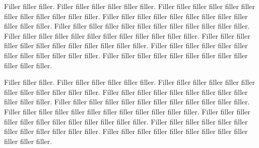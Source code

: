 \documentclass[landscape,twocolumn,letterpaper]{article}
\begin{document}
Filler filler filler.
Filler filler filler filler filler filler.
Filler filler filler filler filler filler filler filler filler filler filler filler.
Filler filler filler filler filler filler filler filler filler filler filler filler.
Filler filler filler filler filler filler filler filler filler filler filler filler.
Filler filler filler filler filler filler filler filler filler filler filler filler.
Filler filler filler filler filler filler filler filler filler filler filler filler.
Filler filler filler filler filler filler filler filler filler filler filler filler.
Filler filler filler filler filler filler filler filler filler filler filler filler.


Filler filler filler.
Filler filler filler filler filler filler.
Filler filler filler filler filler filler filler filler filler filler filler filler.
Filler filler filler filler filler filler filler filler filler filler filler filler.
Filler filler filler filler filler filler filler filler filler filler filler filler.
Filler filler filler filler filler filler filler filler filler filler filler filler.
Filler filler filler filler filler filler filler filler filler filler filler filler.
Filler filler filler filler filler filler filler filler filler filler filler filler.
Filler filler filler filler filler filler filler filler filler filler filler filler.
\end{document}
